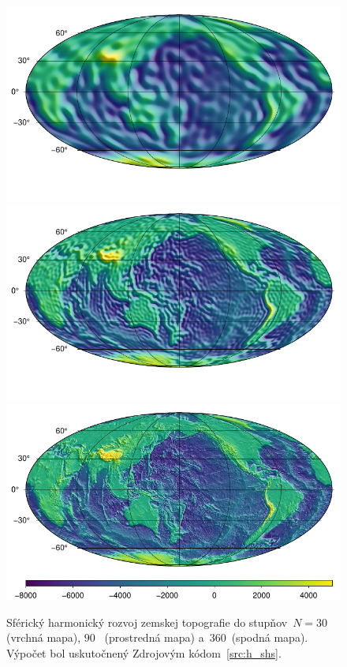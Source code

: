 \documentclass[a4paper,12pt]{book}
\begin{document}
\begin{figure}
\centering
\includegraphics{./fig-h-shs-nmax30.pdf}
\includegraphics{./fig-h-shs-nmax90.pdf}
\includegraphics{./fig-h-shs-nmax360.pdf}
\caption{Sférický harmonický rozvoj zemskej topografie do stupňov~$N = 30$
(vrchná mapa), $90$~ (prostredná mapa) a~$360$~(spodná mapa).  Výpočet bol
uskutočnený Zdrojovým kódom~\ref{src:h_shs}.}
\label{fig:shs_h}
\end{figure}
\end{document}
